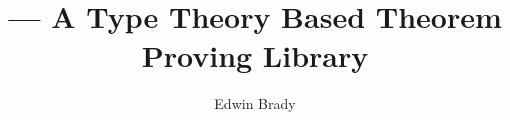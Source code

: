 \documentclass{article}
\begin{document}
\title{\prover{} --- A Type Theory Based Theorem Proving Library}
\author{Edwin Brady}

\maketitle

















\end{document}
